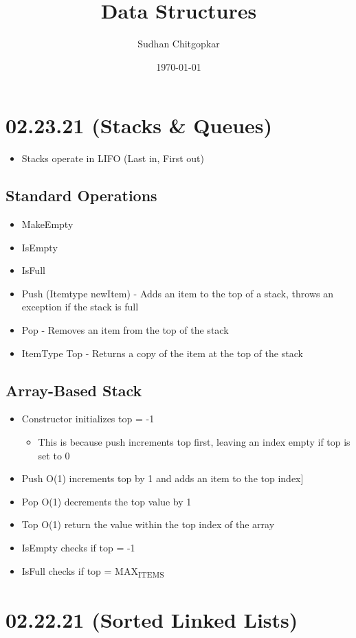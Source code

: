 \documentclass[11pt]{article}
\author{Sudhan Chitgopkar}
\date{\today}
\title{Data Structures}
\begin{document}
\maketitle
\section*{02.23.21 (Stacks \& Queues)}
\label{sec:org1ac953b}
\begin{itemize}
\item Stacks operate in LIFO (Last in, First out)
\end{itemize}
\subsection*{Standard Operations}
\label{sec:org5f97ede}
\begin{itemize}
\item MakeEmpty
\item IsEmpty
\item IsFull
\item Push (Itemtype newItem) - Adds an item to the top of a stack, throws an exception if the stack is full
\item Pop - Removes an item from the top of the stack
\item ItemType Top - Returns a copy of the item at the top of the stack
\end{itemize}
\subsection*{Array-Based Stack}
\label{sec:org008b8a4}
\begin{itemize}
\item Constructor initializes top = -1
\begin{itemize}
\item This is because push increments top first, leaving an index empty if top is set to 0
\end{itemize}
\item Push O(1) increments top by 1 and adds an item to the top index]
\item Pop O(1) decrements the top value by 1
\item Top O(1) return the value within the top index of the array
\item IsEmpty checks if top = -1
\item IsFull checks if top = MAX\textsubscript{ITEMS}
\end{itemize}
\section*{02.22.21 (Sorted Linked Lists)}
\label{sec:orgc926a76}
\end{document}
